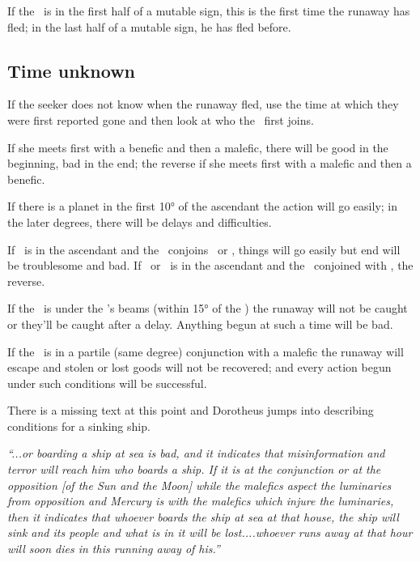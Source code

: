 If the \Moon\, is in the first half of a mutable sign, this is the first time the runaway has fled; in the last half of a mutable sign, he has fled before.

\subsection{Time unknown}
If the seeker does not know when the runaway fled, use the time at which they were first reported gone and then look at who the \Moon\, first joins.

If she meets first with a benefic and then a malefic, there will be good in the beginning, bad in the end; the reverse if she meets first with a malefic and then a benefic.

If there is a planet in the first 10° of the ascendant the action will go easily; in the later degrees, there will be delays and difficulties.

If \Jupiter\, is in the ascendant and the \Moon\, conjoins \Saturn\, or \Mars, things will go easily but end will be troublesome and bad. If \Saturn\, or \Mars\, is in the ascendant and the \Moon\, conjoined with \Jupiter, the reverse.

If the \Moon\, is under the \Sun's beams (within 15° of the \Sun) the runaway will not be caught or they'll be caught after a delay. Anything begun at such a time will be bad.

If the \Moon\, is in a partile (same degree) conjunction with a malefic the runaway will escape and stolen or lost goods will not be recovered; and every action begun under such conditions will be successful.

\begin{mdframed}[backgroundcolor=cyan!5, rightmargin=1em, leftmargin=1em]
There is a missing text at this point and Dorotheus jumps into describing conditions for a sinking ship.
\end{mdframed}

\textsl{``...or boarding a ship at sea is bad, and it indicates that misinformation and terror will reach him who boards a ship. If it is at the conjunction or at the opposition [of the Sun and the Moon] while the malefics aspect the luminaries from opposition and Mercury is with the malefics which injure the luminaries, then it indicates that whoever boards the ship at sea at that house, the ship will sink and its people and what is in it will be lost....whoever runs away at that hour will soon dies in this running away of his.''}

